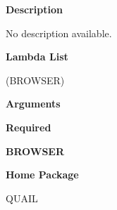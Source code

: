  
{\bf Description}

No description available.

 
{\bf Lambda List}

(BROWSER)

 
{\bf Arguments}


\beginhang
{\bf Required}\hspace{2em}
 
{\bf BROWSER}


 
\endhang
 
{\bf Home Package}

QUAIL

